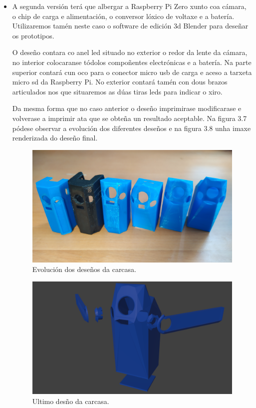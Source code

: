 \begin{itemize}
    \item A segunda versión terá que albergar a Raspberry Pi Zero xunto coa cámara, o chip de carga e alimentación, o conversor lóxico de voltaxe e a batería. Utilizaremos tamén neste caso o software de edición 3d Blender para deseñar os prototipos.

    O deseño contara co anel led situado no exterior o redor da lente da cámara, no interior colocaranse tódolos compoñentes electrónicas e a batería. Na parte superior contará cun oco para o conector micro usb de carga e aceso a tarxeta micro sd da Raspberry Pi. No exterior contará tamén con dous brazos articulados nos que situaremos as dúas tiras leds para indicar o xiro.

    Da mesma forma que no caso anterior o deseño imprimirase modificarase e volverase a imprimir ata que se obteña un resultado aceptable. Na figura 3.7 pódese observar a evolución dos diferentes deseños e na figura 3.8 unha imaxe renderizada do deseño final.


    \begin{figure}[tb]
      \centering
      \includegraphics[scale=.1]{imaxes/evolucion-carcasa.jpg}
      \caption{Evolución dos deseños da carcasa.}
      \label{f:evolucion da carcasa}
    \end{figure}

    \begin{figure}[tb]
      \centering
      \includegraphics[scale=.4]{imaxes/carcasa.png}
      \caption{Ultimo desño da carcasa.}
      \label{f:carcasa}
    \end{figure}


\end{itemize}

